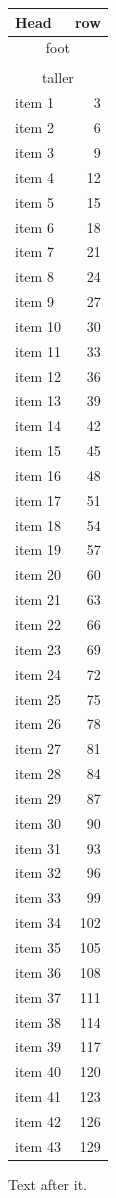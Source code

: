 \documentclass{article}
\begin{document}
\begin{longtable}[r]{lr}
Head & row \\
\endhead
\multicolumn{2}{c}{foot} \\
\endfoot
\multicolumn{2}{c}{last foot} \\[6pt]
\multicolumn{2}{c}{taller} \\
\endlastfoot
item 1 & 3 \\
item 2 & 6 \\
item 3 & 9 \\
item 4 & 12 \\
item 5 & 15 \\
item 6 & 18 \\
item 7 & 21 \\
item 8 & 24 \\
item 9 & 27 \\
item 10 & 30 \\
item 11 & 33 \\
item 12 & 36 \\
item 13 & 39 \\
item 14 & 42 \\
item 15 & 45 \\
item 16 & 48 \\
item 17 & 51 \\
item 18 & 54 \\
item 19 & 57 \\
item 20 & 60 \\
item 21 & 63 \\
item 22 & 66 \\
item 23 & 69 \\
item 24 & 72 \\
item 25 & 75 \\
item 26 & 78 \\
item 27 & 81 \\
item 28 & 84 \\
item 29 & 87 \\
item 30 & 90 \\
item 31 & 93 \\
item 32 & 96 \\
item 33 & 99 \\
item 34 & 102 \\
item 35 & 105 \\
item 36 & 108 \\
item 37 & 111 \\
item 38 & 114 \\
item 39 & 117 \\
item 40 & 120 \\
item 41 & 123 \\
item 42 & 126 \\
item 43 & 129 \\
\end{longtable}
Text after it.
\end{document}
